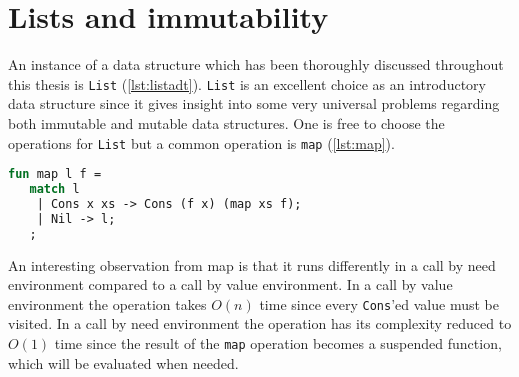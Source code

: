 
\section{Lists and immutability}
An instance of a data structure which has been thoroughly discussed throughout this thesis is \texttt{List} (\autoref{lst:listadt}).
\texttt{List} is an excellent choice as an introductory data structure since it gives insight into some very universal problems regarding both immutable and mutable data structures.
One is free to choose the operations for \texttt{List} but a common operation is \texttt{map} (\autoref{lst:map}).
\begin{lstlisting}[language=ML,caption={Mapping from \texttt{List a} to \texttt{List b}},label={lst:map},mathescape=true]
fun map l f = 
   match l
    | Cons x xs -> Cons (f x) (map xs f);
    | Nil -> l;
   ;
\end{lstlisting}
An interesting observation from map is that it runs differently in a call by need environment compared to a call by value environment.
In a call by value environment the operation takes $O(n)$ time since every \texttt{Cons}'ed value must be visited.
In a call by need environment the operation has its complexity reduced to $O(1)$ time since the result of the \texttt{map} operation becomes a suspended function, which will be evaluated when needed.


